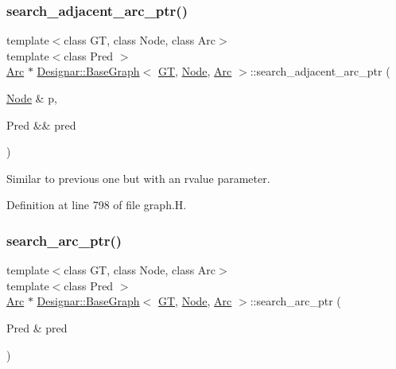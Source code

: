 \subsubsection{\texorpdfstring{search\+\_\+adjacent\+\_\+arc\+\_\+ptr()}{search\_adjacent\_arc\_ptr()}\hspace{0.1cm}{\footnotesize\ttfamily [2/2]}}
{\footnotesize\ttfamily template$<$class GT, class Node, class Arc$>$ \\
template$<$class Pred $>$ \\
\hyperlink{namespace_designar_a3f55fb5513d62ff47cbc8f72b8e95d6f}{Arc} $\ast$ \hyperlink{class_designar_1_1_base_graph}{Designar\+::\+Base\+Graph}$<$ \hyperlink{demo-buildgraph_8_c_a3001c40d2c31ca87ed96cd7d1334a55e}{GT}, \hyperlink{namespace_designar_a5af326c65aa2bd26b26c410f2030d09e}{Node}, \hyperlink{namespace_designar_a3f55fb5513d62ff47cbc8f72b8e95d6f}{Arc} $>$\+::search\+\_\+adjacent\+\_\+arc\+\_\+ptr (\begin{DoxyParamCaption}\item[{\hyperlink{namespace_designar_a5af326c65aa2bd26b26c410f2030d09e}{Node} \&}]{p,  }\item[{Pred \&\&}]{pred }\end{DoxyParamCaption})\hspace{0.3cm}{\ttfamily [inline]}}



Similar to previous one but with an rvalue parameter. 



Definition at line 798 of file graph.\+H.

\mbox{\label{class_designar_1_1_base_graph_a27d1effa356e6570ddca3c71559e7eb7}} 
\subsubsection{\texorpdfstring{search\+\_\+arc\+\_\+ptr()}{search\_arc\_ptr()}\hspace{0.1cm}{\footnotesize\ttfamily [1/2]}}
{\footnotesize\ttfamily template$<$class GT, class Node, class Arc$>$ \\
template$<$class Pred $>$ \\
\hyperlink{namespace_designar_a3f55fb5513d62ff47cbc8f72b8e95d6f}{Arc} $\ast$ \hyperlink{class_designar_1_1_base_graph}{Designar\+::\+Base\+Graph}$<$ \hyperlink{demo-buildgraph_8_c_a3001c40d2c31ca87ed96cd7d1334a55e}{GT}, \hyperlink{namespace_designar_a5af326c65aa2bd26b26c410f2030d09e}{Node}, \hyperlink{namespace_designar_a3f55fb5513d62ff47cbc8f72b8e95d6f}{Arc} $>$\+::search\+\_\+arc\+\_\+ptr (\begin{DoxyParamCaption}\item[{Pred \&}]{pred }\end{DoxyParamCaption})\hspace{0.3cm}{\ttfamily [inline]}}



